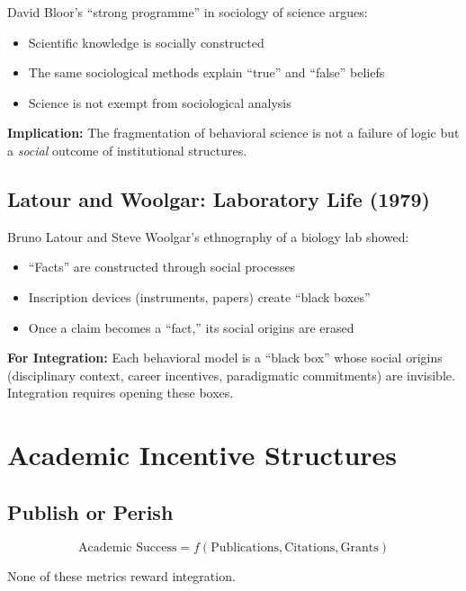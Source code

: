 David Bloor's ``strong programme'' in sociology of science argues:
\begin{itemize}
\item Scientific knowledge is socially constructed
\item The same sociological methods explain ``true'' and ``false'' beliefs
\item Science is not exempt from sociological analysis
\end{itemize}

\textbf{Implication:}
The fragmentation of behavioral science is not a failure of logic but a \textit{social} outcome of institutional structures.

\subsection{Latour and Woolgar: Laboratory Life (1979)}

Bruno Latour and Steve Woolgar's ethnography of a biology lab showed:
\begin{itemize}
\item ``Facts'' are constructed through social processes
\item Inscription devices (instruments, papers) create ``black boxes''
\item Once a claim becomes a ``fact,'' its social origins are erased
\end{itemize}

\textbf{For Integration:}
Each behavioral model is a ``black box'' whose social origins (disciplinary context, career incentives, paradigmatic commitments) are invisible. Integration requires opening these boxes.



\section{Academic Incentive Structures}
\label{sec:meta-incentives}

\subsection{Publish or Perish}

\begin{tcolorbox}[colback=red!5!white, colframe=red!75!black,
    title=The Fundamental Distortion]
\begin{equation}
\text{Academic Success} = f(\text{Publications}, \text{Citations}, \text{Grants})
\end{equation}

None of these metrics reward integration.
\end{tcolorbox}

